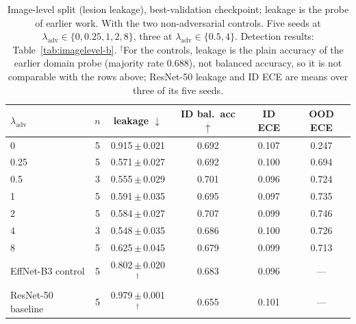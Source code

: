 \documentclass{midl}
\newcommand{\lam}{\lambda_{\mathrm{adv}}}
\begin{document}
\begin{table}[h]
\centering
\caption{Image-level split (lesion leakage), best-validation checkpoint; leakage is the probe of earlier work. With the two
non-adversarial controls. Five seeds at $\lam \in \{0, 0.25, 1, 2, 8\}$, three at
$\lam \in \{0.5, 4\}$. Detection results: Table~\ref{tab:imagelevel-b}. $^\dagger$For the controls, leakage is the plain accuracy of the
earlier domain probe (majority rate $0.688$), not balanced accuracy, so it is not comparable with the rows above;
ResNet-50 leakage and ID ECE are means over three of its five seeds.}
\label{tab:imagelevel}
\begin{tabular}{lccccc}
\toprule
$\lam$ & $n$ & leakage $\downarrow$ & ID bal.\ acc $\uparrow$ & ID ECE & OOD ECE \\
\midrule
0 & 5 & 0.915\,$\pm$\,0.021 & 0.692 & 0.107 & 0.247 \\
0.25 & 5 & 0.571\,$\pm$\,0.027 & 0.692 & 0.100 & 0.694 \\
0.5 & 3 & 0.555\,$\pm$\,0.029 & 0.701 & 0.096 & 0.724 \\
1 & 5 & 0.591\,$\pm$\,0.035 & 0.695 & 0.097 & 0.735 \\
2 & 5 & 0.584\,$\pm$\,0.027 & 0.707 & 0.099 & 0.746 \\
4 & 3 & 0.548\,$\pm$\,0.035 & 0.686 & 0.100 & 0.726 \\
8 & 5 & 0.625\,$\pm$\,0.045 & 0.679 & 0.099 & 0.713 \\
\midrule
EffNet-B3 control & 5 & 0.802\,$\pm$\,0.020$^\dagger$ & 0.683 & 0.096 & --- \\
ResNet-50 baseline & 5 & 0.979\,$\pm$\,0.001$^\dagger$ & 0.655 & 0.101 & --- \\
\bottomrule
\end{tabular}
\end{table}
\end{document}
